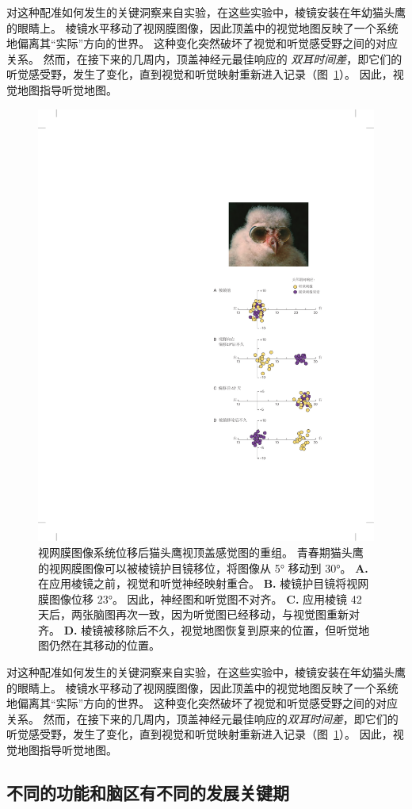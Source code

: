 对这种配准如何发生的关键洞察来自实验，在这些实验中，棱镜安装在年幼猫头鹰的眼睛上。
棱镜水平移动了视网膜图像，因此顶盖中的视觉地图反映了一个系统地偏离其“实际”方向的世界。
这种变化突然破坏了视觉和听觉感受野之间的对应关系。 
然而，在接下来的几周内，顶盖神经元最佳响应的
\textit{双耳时间差}，即它们的听觉感受野，发生了变化，直到视觉和听觉映射重新进入记录（图~\ref{fig:49_16}）。 
因此，视觉地图指导听觉地图。


\begin{figure}[htbp]
	\centering
	\includegraphics[width=0.59\linewidth]{chap49/fig_49_16}
	\caption{视网膜图像系统位移后猫头鹰视顶盖感觉图的重组。
		青春期猫头鹰的视网膜图像可以被棱镜护目镜移位，将图像从 5° 移动到 30°\cite{knudsen2002instructed}。
		\textbf{A.} 在应用棱镜之前，视觉和听觉神经映射重合。
		\textbf{B.} 棱镜护目镜将视网膜图像位移 23°。
		因此，神经图和听觉图不对齐。
		\textbf{C.} 应用棱镜 42 天后，两张脑图再次一致，因为听觉图已经移动，与视觉图重新对齐。
		\textbf{D.} 棱镜被移除后不久，视觉地图恢复到原来的位置，但听觉地图仍然在其移动的位置。}
	\label{fig:49_16}
\end{figure}


对这种配准如何发生的关键洞察来自实验，在这些实验中，棱镜安装在年幼猫头鹰的眼睛上。
棱镜水平移动了视网膜图像，因此顶盖中的视觉地图反映了一个系统地偏离其“实际”方向的世界。
这种变化突然破坏了视觉和听觉感受野之间的对应关系。
然而，在接下来的几周内，顶盖神经元最佳响应的\textit{双耳时间差}，即它们的听觉感受野，发生了变化，直到视觉和听觉映射重新进入记录（图~\ref{fig:49_16}）。
因此，视觉地图指导听觉地图。



\subsection{不同的功能和脑区有不同的发展关键期}

